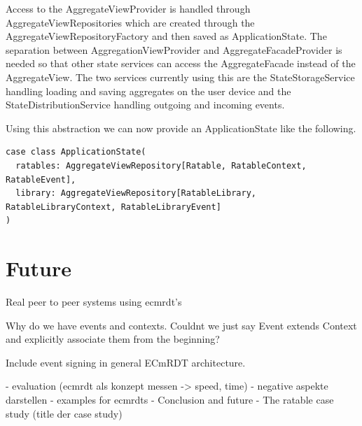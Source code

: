 \documentclass[
	ngerman,
	ruledheaders=section,   %
	class=report,		    %
	thesis={type=bachelor}, %
	accentcolor=9c,			%
	custommargins=true,    %
	marginpar=false,        %
	parskip=half-,          %
	fontsize=11pt,          %
]{tudapub}
\begin{document}
Access to the AggregateViewProvider is handled through AggregateViewRepositories which are created through the AggregateViewRepositoryFactory and then saved as ApplicationState. The separation between AggregationViewProvider and AggregateFacadeProvider is needed so that other state services can access the AggregateFacade instead of the AggregateView. The two services currently using this are the StateStorageService handling loading and saving aggregates on the user device and the StateDistributionService handling outgoing and incoming events. 

Using this abstraction we can now provide an ApplicationState like the following.

\begin{lstlisting}
case class ApplicationState(
  ratables: AggregateViewRepository[Ratable, RatableContext, RatableEvent],
  library: AggregateViewRepository[RatableLibrary, RatableLibraryContext, RatableLibraryEvent]
)
\end{lstlisting}

\chapter{Future}
Real peer to peer systems using ecmrdt's

Why do we have events and contexts. Couldnt we just say Event extends Context and explicitly associate them from the beginning?

Include event signing in general ECmRDT architecture.

- evaluation (ecmrdt als konzept messen -> speed, time)
- negative aspekte darstellen
- examples for ecmrdts
- Conclusion and future
- The ratable case study (title der case study)
\end{document}
